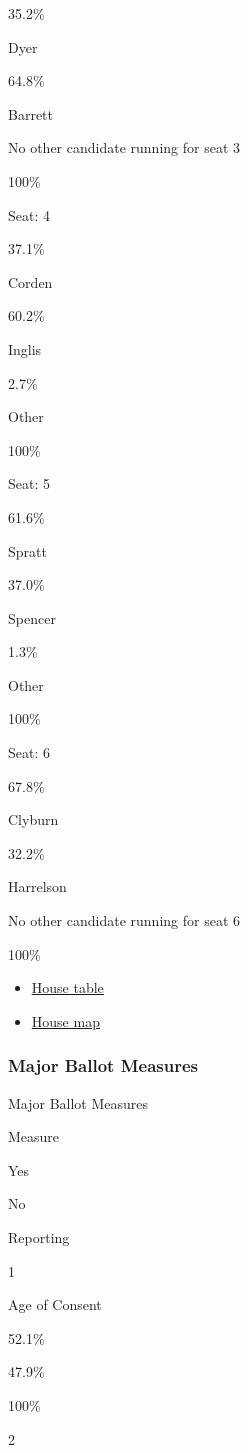 35.2\%

Dyer

64.8\%

Barrett

No other candidate running for seat 3

100\%

Seat: 4

37.1\%

Corden

60.2\%

Inglis

2.7\%

Other

100\%

Seat: 5

61.6\%

Spratt

37.0\%

Spencer

1.3\%

Other

100\%

Seat: 6

67.8\%

Clyburn

32.2\%

Harrelson

No other candidate running for seat 6

100\%

\begin{itemize}
\tightlist
\item
  \href{../house/votes.html}{House table}
\item
  \href{../house/map.html}{House map}
\end{itemize}

\hypertarget{major-ballot-measures}{%
\subsubsection{Major Ballot Measures}\label{major-ballot-measures}}

Major Ballot Measures

Measure

Yes

No

Reporting

1

Age of Consent

52.1\%

47.9\%

100\%

2

